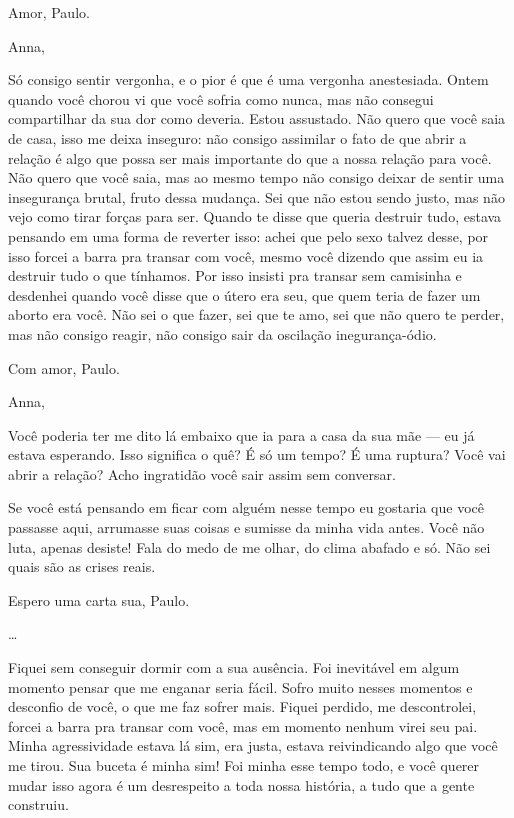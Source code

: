 \medskip{}  \begin{flushright}Amor, Paulo.\end{flushright}


\asterisc{}

\pagebreak{}

Anna,

\medskip{} 

Só consigo sentir vergonha, e o pior é que é uma vergonha anestesiada.
Ontem quando você chorou vi que você sofria como nunca, mas não consegui
compartilhar da sua dor como deveria. Estou assustado. Não quero que
você saia de casa, isso me deixa inseguro: não consigo assimilar o fato
de que abrir a relação é algo que possa ser mais importante do que a
nossa relação para você. Não quero que você saia, mas ao mesmo tempo não
consigo deixar de sentir uma insegurança brutal, fruto dessa mudança.
Sei que não estou sendo justo, mas não vejo como tirar forças para ser.
Quando te disse que queria destruir tudo, estava pensando em uma forma
de reverter isso: achei que pelo sexo talvez desse, por isso forcei a
barra pra transar com você, mesmo você dizendo que assim eu ia destruir
tudo o que tínhamos. Por isso insisti pra transar sem camisinha e
desdenhei quando você disse que o útero era seu, que quem teria de fazer
um aborto era você. Não sei o que fazer, sei que te amo, sei que não
quero te perder, mas não consigo reagir, não consigo sair da oscilação
inegurança-ódio.

\medskip{}  \begin{flushright}Com amor, Paulo.\end{flushright}


\asterisc{}

Anna,

\medskip{} 

Você poderia ter me dito lá embaixo que ia para a casa da sua mãe --- eu
já estava esperando. Isso significa o quê? É só um tempo? É uma ruptura?
Você vai abrir a relação? Acho ingratidão você sair assim sem conversar.

Se você está pensando em ficar com alguém nesse tempo eu gostaria que
você passasse aqui, arrumasse suas coisas e sumisse da minha vida antes.
Você não luta, apenas desiste! Fala do medo de me olhar, do clima
abafado e só. Não sei quais são as crises reais.

Espero uma carta sua, Paulo.

…

Fiquei sem conseguir dormir com a sua ausência. Foi inevitável em algum
momento pensar que me enganar seria fácil. Sofro muito nesses momentos e
desconfio de você, o que me faz sofrer mais. Fiquei perdido, me
descontrolei, forcei a barra pra transar com você, mas em momento nenhum
virei seu pai. Minha agressividade estava lá sim, era justa, estava
reivindicando algo que você me tirou. Sua buceta é minha sim! Foi minha
esse tempo todo, e você querer mudar isso agora é um desrespeito a toda
nossa história, a tudo que a gente construiu.

